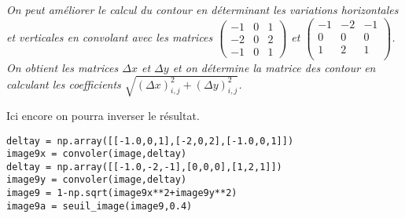 \begin{Exercise}[title=Contour 2]\it On peut améliorer le calcul du contour en déterminant les variations horizontales et verticales en convolant avec les matrices 
$\begin{pmatrix} -1&0&1\\ -2&0&2\\ -1&0&1 \end{pmatrix}$ et  $\begin{pmatrix} -1&-2&-1\\ 0&0&0\\ 1&2&1\\ \end{pmatrix}$. On obtient les matrices 
$\Delta x$ et $\Delta y$ et on détermine la matrice des contour en calculant les coefficients $\sqrt{(\Delta x)_{i,j}^2+(\Delta y)_{i,j}^2}$.

Ici encore on pourra inverser le résultat.
\end{Exercise}
\begin{Answer} 
\begin{lstlisting}
deltay = np.array([[-1.0,0,1],[-2,0,2],[-1.0,0,1]])            
image9x = convoler(image,deltay)
deltay = np.array([[-1.0,-2,-1],[0,0,0],[1,2,1]])            
image9y = convoler(image,deltay)
image9 = 1-np.sqrt(image9x**2+image9y**2)
image9a = seuil_image(image9,0.4)
\end{lstlisting}
\end{Answer}
\newpage

